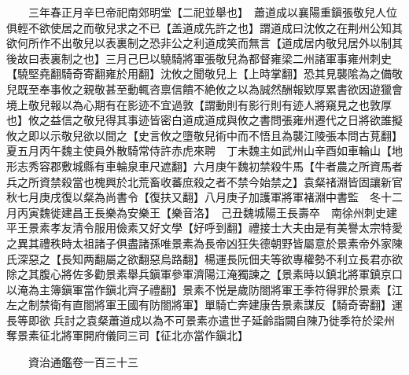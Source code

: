 　　三年春正月辛巳帝祀南郊明堂【二祀並舉也】　蕭道成以襄陽重鎭張敬兒人位俱輕不欲使居之而敬兒求之不已【盖道成先許之也】謂道成曰沈攸之在荆州公知其欲何所作不出敬兒以表裏制之恐非公之利道成笑而無言【道成居内敬兒居外以制其後故曰表裏制之也】三月己巳以驍騎將軍張敬兒為都督雍梁二州諸軍事雍州刺史【驍堅堯翻騎奇寄翻雍於用翻】沈攸之聞敬兒上【上時掌翻】恐其見襲隂為之備敬兒既至奉事攸之親敬甚至動輒咨禀信饋不絶攸之以為誠然酬報欵厚累書欲因遊獵會境上敬兒報以為心期有在影迹不宜過敦【謂動則有影行則有迹人將窺見之也敦厚也】攸之益信之敬兒得其事迹皆密白道成道成與攸之書問張雍州遷代之日將欲誰擬攸之即以示敬兒欲以間之【史言攸之墮敬兒術中而不悟且為襲江陵張本問古莧翻】　夏五月丙午魏主使員外散騎常侍許赤虎來聘　丁未魏主如武州山辛酉如車輪山【地形志秀容郡敷城縣有車輪泉車尺遮翻】六月庚午魏初禁殺牛馬【牛者農之所資馬者兵之所資禁殺當也槐興於北荒畜收蕃庶殺之者不禁今始禁之】袁粲禇淵皆固讓新官秋七月庚戌復以粲為尚書令【復扶又翻】八月庚子加護軍將軍褚淵中書監　冬十二月丙寅魏徙建昌王長樂為安樂王【樂音洛】　己丑魏城陽王長壽卒　南徐州刺史建平王景素孝友清令服用儉素又好文學【好呼到翻】禮接士大夫由是有美譽太宗特愛之異其禮秩時太祖諸子俱盡諸孫唯景素為長帝凶狂失德朝野皆屬意於景素帝外家陳氏深惡之【長知两翻屬之欲翻惡烏路翻】楊運長阮佃夫等欲專權勢不利立長君亦欲除之其腹心將佐多勸景素舉兵鎭軍參軍濟陽江淹獨諫之【景素時以鎮北將軍鎮京口以淹為主簿鎭軍當作鎭北齊子禮翻】景素不悦是歲防閤將軍王季符得罪於景素【江左之制禁衛有直閤將軍王國有防閤將軍】單騎亡奔建康告景素謀反【騎奇寄翻】運長等即欲兵討之袁粲蕭道成以為不可景素亦遣世子延齡詣闕自陳乃徙季符於梁州奪景素征北將軍開府儀同三司【征北亦當作鎭北】

　　資治通鑑卷一百三十三  
    


 


 



 

 
  







 


　　
　　
　
　
　


　　

　















